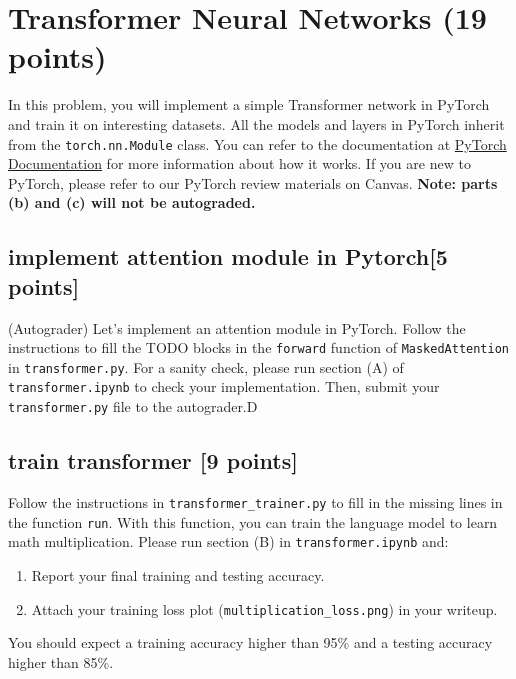 \documentclass[lang=cn,11pt]{elegantbook}
\begin{document}
\section{Transformer Neural Networks (19 points)}

In this problem, you will implement a simple Transformer network in PyTorch and train it on interesting datasets. All the models and layers in PyTorch inherit from the \texttt{torch.nn.Module} class. You can refer to the documentation at \href{https://pytorch.org/docs/stable/generated/torch.nn.Module.html}{PyTorch Documentation} for more information about how it works. If you are new to PyTorch, please refer to our PyTorch review materials on Canvas. \textbf{Note: parts (b) and (c) will not be autograded.}

\subsection*{implement attention module in Pytorch[5 points]}
(Autograder) Let's implement an attention module in PyTorch. Follow the instructions to fill the TODO blocks in the \texttt{forward} function of \texttt{MaskedAttention} in \texttt{transformer.py}. For a sanity check, please run section (A) of \texttt{transformer.ipynb} to check your implementation. Then, submit your \texttt{transformer.py} file to the autograder.D

\subsection*{train transformer [9 points]}
Follow the instructions in \texttt{transformer\_trainer.py} to fill in the missing lines in the function \texttt{run}. With this function, you can train the language model to learn math multiplication. Please run section (B) in \texttt{transformer.ipynb} and:
\begin{enumerate}
    \item Report your final training and testing accuracy.
    \item Attach your training loss plot (\texttt{multiplication\_loss.png}) in your writeup.
\end{enumerate}
You should expect a training accuracy higher than 95\% and a testing accuracy higher than 85\%.
\end{document}
